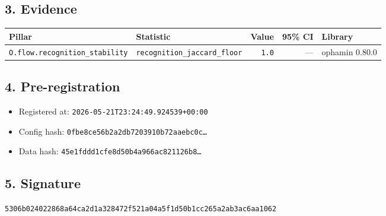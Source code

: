 \documentclass{article}
\begin{document}
\subsection*{3. Evidence}
\begin{tabular}{llrrl}\toprule
\textbf{Pillar} & \textbf{Statistic} & \textbf{Value} & \textbf{95\% CI} & \textbf{Library} \\\midrule
\texttt{O.flow.recognition\_stability} & \texttt{recognition\_jaccard\_floor} & \texttt{1.0} & --- & ophamin 0.80.0 \\
\bottomrule\end{tabular}
\subsection*{4. Pre-registration}
\begin{itemize}
\item Registered at: \texttt{2026-05-21T23:24:49.924539+00:00}
\item Config hash: \texttt{0fbe8ce56b2a2db7203910b72aaebc0c\dots}
\item Data hash: \texttt{45e1fddd1cfe8d50b4a966ac821126b8\dots}
\end{itemize}
\subsection*{5. Signature}
\texttt{5306b024022868a64ca2d1a328472f521a04a5f1d50b1cc265a2ab3ac6aa1062}\\
\end{document}
